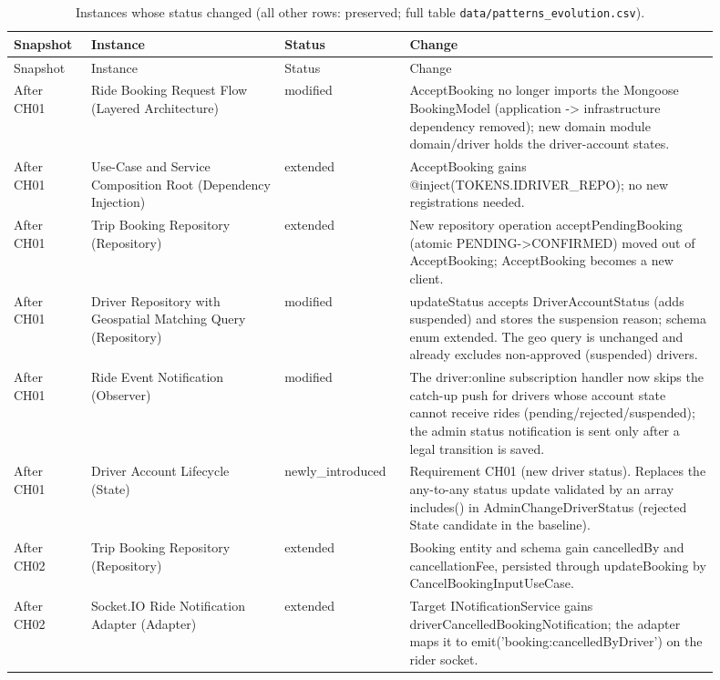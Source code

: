 \documentclass[11pt,a4paper]{article}
\begin{document}
\begin{longtable}{@{}P{0.09\linewidth}P{0.25\linewidth}P{0.16\linewidth}P{0.4\linewidth}@{}}
\caption{Instances whose status changed (all other rows: preserved; full table \texttt{data/patterns\_evolution.csv}).}\label{tab:evo}\\
\toprule Snapshot & Instance & Status & Change\\\midrule\endfirsthead
\toprule Snapshot & Instance & Status & Change\\\midrule\endhead
After CH01 & Ride Booking Request Flow (Layered Architecture) & modified & AcceptBooking no longer imports the Mongoose BookingModel (application -\textgreater{} infrastructure dependency removed); new domain module domain/driver holds the driver-account states. \\
After CH01 & Use-Case and Service Composition Root (Dependency Injection) & extended & AcceptBooking gains @inject(TOKENS.IDRIVER\_REPO); no new registrations needed. \\
After CH01 & Trip Booking Repository (Repository) & extended & New repository operation acceptPendingBooking (atomic PENDING-\textgreater{}CONFIRMED) moved out of AcceptBooking; AcceptBooking becomes a new client. \\
After CH01 & Driver Repository with Geospatial Matching Query (Repository) & modified & updateStatus accepts DriverAccountStatus (adds suspended) and stores the suspension reason; schema enum extended. The geo query is unchanged and already excludes non-approved (suspended) drivers. \\
After CH01 & Ride Event Notification (Observer) & modified & The driver:online subscription handler now skips the catch-up push for drivers whose account state cannot receive rides (pending/rejected/suspended); the admin status notification is sent only after a legal transition is saved. \\
After CH01 & Driver Account Lifecycle (State) & newly\_\allowbreak{}introduced & Requirement CH01 (new driver status). Replaces the any-to-any status update validated by an array includes() in AdminChangeDriverStatus (rejected State candidate in the baseline). \\
After CH02 & Trip Booking Repository (Repository) & extended & Booking entity and schema gain cancelledBy and cancellationFee, persisted through updateBooking by CancelBookingInputUseCase. \\
After CH02 & Socket.IO Ride Notification Adapter (Adapter) & extended & Target INotificationService gains driverCancelledBookingNotification; the adapter maps it to emit('booking:cancelledByDriver') on the rider socket. \\

\end{longtable}
\end{document}

